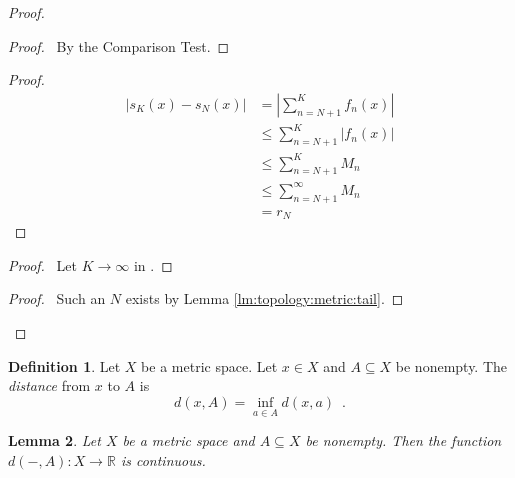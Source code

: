 \documentclass{report}
\let\qed\relax
\newtheorem{lm}{Lemma}[section]
\theoremstyle{definition}
\newtheorem{df}[lm]{Definition}
\begin{document}
  \begin{proof}
    \pf
    \begin{proof}
      \pf\ By the Comparison Test.
    \end{proof}
    \begin{proof}
      \pf
      \begin{align*}
        |s_K(x) - s_N(x)| & = \left| \sum_{n = N+1}^K f_n(x) \right| \\
        & \leq \sum_{n=N+1}^K |f_n(x)| \\
        & \leq \sum_{n=N+1}^K M_n \\
        & \leq \sum_{n=N+1}^\infty M_n \\
        & = r_N
      \end{align*}
    \end{proof}
    \begin{proof}
      \pf\ Let $K \rightarrow \infty$ in .
    \end{proof}
    \begin{proof}
      \pf\ Such an $N$ exists by Lemma \ref{lm:topology:metric:tail}.
    \end{proof}
    \qed
  \end{proof}

  \begin{df}
    Let $X$ be a metric space. Let $x \in X$ and $A \subseteq X$ be nonempty.
    The     \emph{distance} from $x$ to $A$ is
    \[ d(x, A) = \inf_{a \in A} d(x, a) \enspace . \]
  \end{df}

  \begin{lm}
    \label{lm:topology:metric:dist_continuous}
    Let $X$ be a metric space and $A \subseteq X$ be nonempty. Then the
    function
    $d(-, A) : X \rightarrow \mathbb{R}$ is continuous.
  \end{lm}
\end{document}
